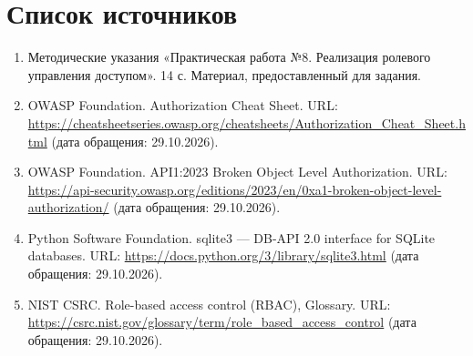 \documentclass[12pt,a4paper]{article}
\begin{document}
\section{Список источников}
\begin{enumerate}
\item Методические указания «Практическая работа №8. Реализация ролевого управления доступом». 14 с. Материал, предоставленный для задания.
\item OWASP Foundation. Authorization Cheat Sheet. URL: \url{https://cheatsheetseries.owasp.org/cheatsheets/Authorization_Cheat_Sheet.html} (дата обращения: 29.10.2026).
\item OWASP Foundation. API1:2023 Broken Object Level Authorization. URL: \url{https://api-security.owasp.org/editions/2023/en/0xa1-broken-object-level-authorization/} (дата обращения: 29.10.2026).
\item Python Software Foundation. sqlite3 — DB-API 2.0 interface for SQLite databases. URL: \url{https://docs.python.org/3/library/sqlite3.html} (дата обращения: 29.10.2026).
\item NIST CSRC. Role-based access control (RBAC), Glossary. URL: \url{https://csrc.nist.gov/glossary/term/role_based_access_control} (дата обращения: 29.10.2026).
\end{enumerate}
\end{document}
